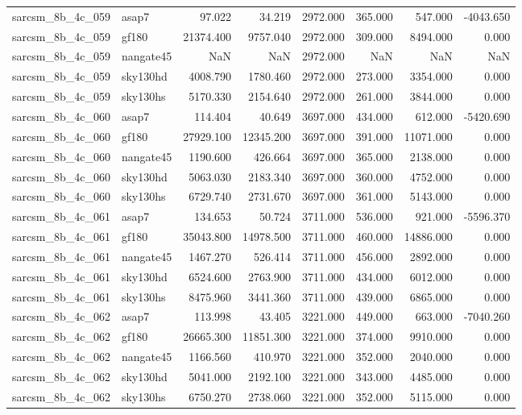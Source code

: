 \begin{tabular}{llrrrrrr}
sarcsm\_8b\_4c\_059 & asap7 & 97.022 & 34.219 & 2972.000 & 365.000 & 547.000 & -4043.650 \\
sarcsm\_8b\_4c\_059 & gf180 & 21374.400 & 9757.040 & 2972.000 & 309.000 & 8494.000 & 0.000 \\
sarcsm\_8b\_4c\_059 & nangate45 & NaN & NaN & 2972.000 & NaN & NaN & NaN \\
sarcsm\_8b\_4c\_059 & sky130hd & 4008.790 & 1780.460 & 2972.000 & 273.000 & 3354.000 & 0.000 \\
sarcsm\_8b\_4c\_059 & sky130hs & 5170.330 & 2154.640 & 2972.000 & 261.000 & 3844.000 & 0.000 \\
sarcsm\_8b\_4c\_060 & asap7 & 114.404 & 40.649 & 3697.000 & 434.000 & 612.000 & -5420.690 \\
sarcsm\_8b\_4c\_060 & gf180 & 27929.100 & 12345.200 & 3697.000 & 391.000 & 11071.000 & 0.000 \\
sarcsm\_8b\_4c\_060 & nangate45 & 1190.600 & 426.664 & 3697.000 & 365.000 & 2138.000 & 0.000 \\
sarcsm\_8b\_4c\_060 & sky130hd & 5063.030 & 2183.340 & 3697.000 & 360.000 & 4752.000 & 0.000 \\
sarcsm\_8b\_4c\_060 & sky130hs & 6729.740 & 2731.670 & 3697.000 & 361.000 & 5143.000 & 0.000 \\
sarcsm\_8b\_4c\_061 & asap7 & 134.653 & 50.724 & 3711.000 & 536.000 & 921.000 & -5596.370 \\
sarcsm\_8b\_4c\_061 & gf180 & 35043.800 & 14978.500 & 3711.000 & 460.000 & 14886.000 & 0.000 \\
sarcsm\_8b\_4c\_061 & nangate45 & 1467.270 & 526.414 & 3711.000 & 456.000 & 2892.000 & 0.000 \\
sarcsm\_8b\_4c\_061 & sky130hd & 6524.600 & 2763.900 & 3711.000 & 434.000 & 6012.000 & 0.000 \\
sarcsm\_8b\_4c\_061 & sky130hs & 8475.960 & 3441.360 & 3711.000 & 439.000 & 6865.000 & 0.000 \\
sarcsm\_8b\_4c\_062 & asap7 & 113.998 & 43.405 & 3221.000 & 449.000 & 663.000 & -7040.260 \\
sarcsm\_8b\_4c\_062 & gf180 & 26665.300 & 11851.300 & 3221.000 & 374.000 & 9910.000 & 0.000 \\
sarcsm\_8b\_4c\_062 & nangate45 & 1166.560 & 410.970 & 3221.000 & 352.000 & 2040.000 & 0.000 \\
sarcsm\_8b\_4c\_062 & sky130hd & 5041.000 & 2192.100 & 3221.000 & 343.000 & 4485.000 & 0.000 \\
sarcsm\_8b\_4c\_062 & sky130hs & 6750.270 & 2738.060 & 3221.000 & 352.000 & 5115.000 & 0.000 \\

\end{tabular}
